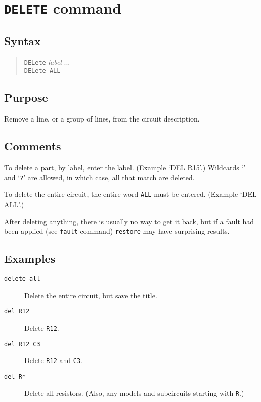 \section{{\tt DELETE} command}
\subsection{Syntax}
\begin{verse}
{\tt DELete} {\it label} ...\\
{\tt DELete ALL}
\end{verse}
\subsection{Purpose}

Remove a line, or a group of lines, from the circuit description.
\subsection{Comments}

To delete a part, by label, enter the label.  (Example `DEL R15'.)
Wildcards `{\tt *}' and `{\tt ?}' are allowed, in which case, all that match
are deleted.

To delete the entire circuit, the entire word {\tt ALL} must be entered.
(Example `DEL ALL'.)

After deleting anything, there is usually no way to get it back, but if a
fault had been applied (see {\tt fault} command) {\tt restore} may have
surprising results.
\subsection{Examples}

\begin{description}

\item[{\tt delete all}] Delete the entire circuit, but save the title.

\item[{\tt del R12}] Delete {\tt R12}.

\item[{\tt del R12 C3}] Delete {\tt R12} and {\tt C3}.

\item[{\tt del R*}] Delete all resistors.  (Also, any models and subcircuits
starting with {\tt R}.)

\end{description}

